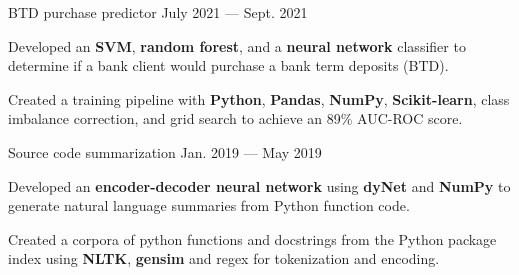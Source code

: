 
\vspace{-0.2cm}

\begin{cventries}

  \cventry
    {} %
    {BTD purchase predictor \href{https://github.com/pauldhein/marketing-campaign-classifier}{\faExternalLink}} %
    {July 2021 --- Sept. 2021} %
    {} %
    {
      \vspace{-1cm}
      \begin{cvitems} %
        \item Developed an \textbf{SVM}, \textbf{random forest}, and a \textbf{neural network} classifier to determine if a bank client would purchase a bank term deposits (BTD).
        \item Created a training pipeline with \textbf{Python}, \textbf{Pandas}, \textbf{NumPy}, \textbf{Scikit-learn}, class imbalance correction, and grid search to achieve an 89\% AUC-ROC score. 
      \end{cvitems}
    }
  \vspace{.2cm}
  \cventry
    {} %
    {Source code summarization \href{https://github.com/pauldhein/code-summarization}{\faExternalLink}} %
    {Jan. 2019 --- May 2019} %
    {} %
    {
      \vspace{-1cm}
      \begin{cvitems} %
        \item Developed an \textbf{encoder-decoder neural network} using \textbf{dyNet} and \textbf{NumPy} to generate natural language summaries from Python function code.
        \item Created a corpora of python functions and docstrings from the Python package index using \textbf{NLTK}, \textbf{gensim} and regex for tokenization and encoding.
      \end{cvitems}
    }

\end{cventries}
